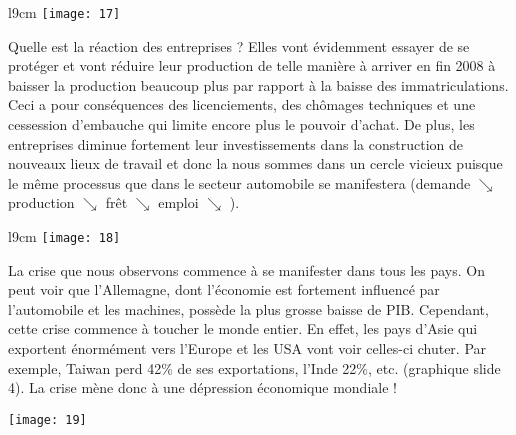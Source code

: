 \begin{wrapfigure}[11]{l}{9cm}
	\texttt{[image: 17]}
\end{wrapfigure}
Quelle est la réaction des entreprises ? Elles vont évidemment essayer de se protéger et vont réduire leur production de telle manière à arriver en fin 2008 à baisser la production beaucoup plus par rapport à la baisse des immatriculations. Ceci a pour conséquences des licenciements, des chômages techniques et une cessession d'embauche qui limite encore plus le pouvoir d'achat. De plus, les entreprises diminue fortement leur investissements dans la construction de nouveaux lieux de travail et donc la nous sommes dans un cercle vicieux puisque le même processus que dans le secteur automobile se manifestera (demande $\searrow$ production $\searrow$ frêt $\searrow$ emploi $\searrow$ ).

\begin{wrapfigure}[11]{l}{9cm}
	\texttt{[image: 18]}
\end{wrapfigure}
La crise que nous observons commence à se manifester dans tous les pays. On peut voir que l'Allemagne, dont l'économie est fortement influencé par l'automobile et les machines, possède la plus grosse baisse de PIB. Cependant, cette crise commence à toucher le monde entier. En effet, les pays d'Asie qui exportent énormément vers l'Europe et les USA vont voir celles-ci chuter. Par exemple, Taiwan perd 42\% de ses exportations, l'Inde 22\%, etc. (graphique slide 4). La crise mène donc à une dépression économique mondiale ! 
\begin{center}
	\texttt{[image: 19]}
\end{center} 
